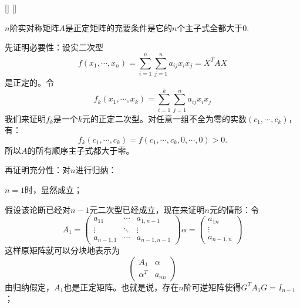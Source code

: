 \documentclass[UTF8]{ctexart}
\begin{document}
		\begin{thm}
			[]
			{}
			[]
			[]
			
			$n$阶实对称矩阵$A$是正定矩阵的充要条件是它的$n$个主子式全都大于0.
		\end{thm}

		\begin{prf}
			先证明必要性：设实二次型\[ f(x_1,\cdots,x_n)=\sum_{i = 1}^{n} \sum_{j = 1}^{n}a_{ij}x_ix_j =X^TAX  
			\]是正定的。令\[ f_k(x_1,\cdots,x_k)=\sum_{i = 1}^{k} \sum_{j = 1}^{n}a_{ij}x_ix_j
			\]
			我们来证明$f_k$是一个$k$元的正定二次型。对任意一组不全为零的实数$(c_1,\cdots,c_k)$，有：\[ f_k(c_1,\cdots,c_k)=f(c_1,\cdots,c_k,0,\cdots,0)>0.
			\]
			所以$A$的所有顺序主子式都大于零。

			再证明充分性：对$n$进行归纳：

			$n=1$时，显然成立；

			假设该论断已经对$n-1$元二次型已经成立，现在来证明$n$元的情形：令\[ A_1=\begin{pmatrix}
				a_{11}&\cdots&a_{1,n-1}\\\vdots&\ddots&\vdots\\a_{n-1,1}&\cdots&a_{n-1,n-1}
			\end{pmatrix}
			\alpha=\begin{pmatrix}
				a_{1n}\\\vdots\\a_{n-1,n}
			\end{pmatrix}
			\]
			这样原矩阵就可以分块地表示为
			\[ \begin{pmatrix}
				A_1&\alpha\\\alpha^T&a_{nn}
			\end{pmatrix}
			\]
			由归纳假定，$A_1$也是正定矩阵。也就是说，存在$n$阶可逆矩阵使得$G^TA_1G=I_{n-1}$；
			

\end{prf}
\end{document}
